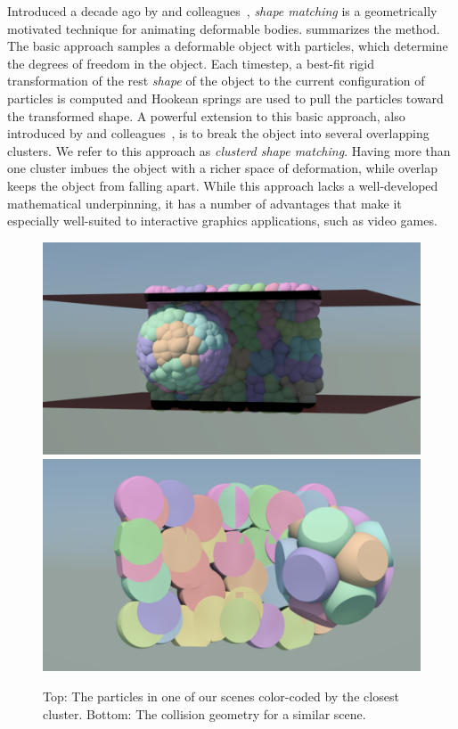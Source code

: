 \documentclass[review]{acmsiggraph}
\begin{document}
Introduced a decade ago by \Mueller and
colleagues~, 
{\em shape matching} is a
geometrically motivated technique for animating deformable bodies.
 summarizes the method.
The basic approach samples a deformable object with particles, which
determine the degrees of freedom in the object.  Each timestep, a best-fit
rigid transformation of the rest {\em shape} of the object to the 
current configuration of particles is computed and Hookean springs
are used to pull the particles toward the transformed shape.
A powerful extension to this basic approach, also introduced by 
\Mueller and colleagues~, is to break the
object into several overlapping clusters.  We refer to this approach as
{\em clusterd shape matching}.  Having more than one cluster imbues
the object with a richer space of deformation, while overlap keeps
the object from falling apart.
While this approach lacks a well-developed mathematical
underpinning, it has a number of advantages that make it especially
well-suited to interactive graphics applications, such as video games.

\begin{figure}[t!]
\includegraphics[width=\linewidth]{Figures/clusterparticles.png}
\includegraphics[width=\linewidth]{Figures/clustercollision.png}
\caption{Top: The particles in one of our scenes color-coded by the closest cluster.
Bottom: The collision geometry for a similar scene.}
\end{figure}
\end{document}
